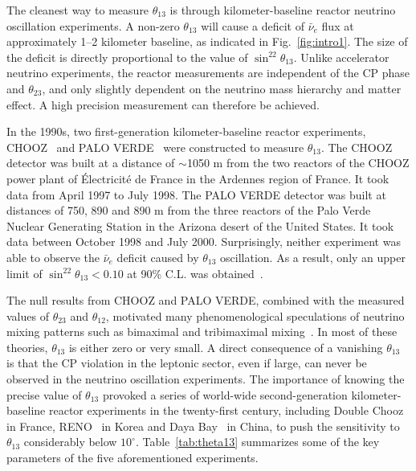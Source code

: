 \documentclass[aps,twocolumn,preprintnumbers,amsmath,superscriptaddress,amssymb,floats,nofootinbib]{revtex4-1}
\begin{document}
The cleanest way to measure $\theta_{13}$ is through kilometer-baseline reactor neutrino oscillation experiments. A non-zero $\theta_{13}$ will cause a deficit of $\bar\nu_e$ flux at approximately 1--2 kilometer baseline, as indicated in Fig.~\ref{fig:intro1}. The size of the deficit is directly proportional to the value of $\sin^22\theta_{13}$.  Unlike accelerator neutrino experiments, the reactor measurements are independent of the CP phase and $\theta_{23}$, and only slightly dependent on the neutrino mass hierarchy and matter effect. A high precision measurement can therefore be achieved.

In the 1990s, two first-generation kilometer-baseline reactor experiments, CHOOZ~\cite{Chooz} and PALO VERDE~\cite{Paloverde} were constructed to measure $\theta_{13}$.
The CHOOZ detector was built at a distance of $\sim$1050 m from the two reactors of the CHOOZ power plant of \'{E}lectricit\'e de France in the Ardennes region of France. It took data from April 1997 to July 1998.
The PALO VERDE detector was built at distances of 750, 890 and 890 m from the three reactors of the Palo Verde Nuclear Generating Station in the Arizona desert of the United States. It took data between October 1998 and July 2000.
Surprisingly, neither experiment was able to observe the $\bar\nu_e$ deficit caused by $\theta_{13}$ oscillation.
As a result, only an upper limit of $\sin^22\theta_{13} < 0.10$ at 90\% C.L. was obtained~\cite{Chooz}.

The null results from CHOOZ and PALO VERDE, combined with the measured values of $\theta_{23}$ and $\theta_{12}$, motivated many phenomenological speculations of neutrino mixing patterns such as bimaximal and tribimaximal mixing~\cite{Harrison,Altarelli}.
In most of these theories, $\theta_{13}$ is either zero or very small.
A direct consequence of a vanishing $\theta_{13}$ is that the CP violation in the leptonic sector, even if large, can never be observed in the neutrino oscillation experiments.
The importance of knowing the precise value of $\theta_{13}$ provoked a series of world-wide second-generation kilometer-baseline reactor experiments in the twenty-first century, including Double Chooz~\cite{DChooz} in France, RENO~\cite{Reno} in Korea and Daya Bay~\cite{Dayabay} in China, to push the sensitivity to $\theta_{13}$ considerably below $10^\circ$.
Table~\ref{tab:theta13} summarizes some of the key parameters of the five aforementioned experiments.
\end{document}
